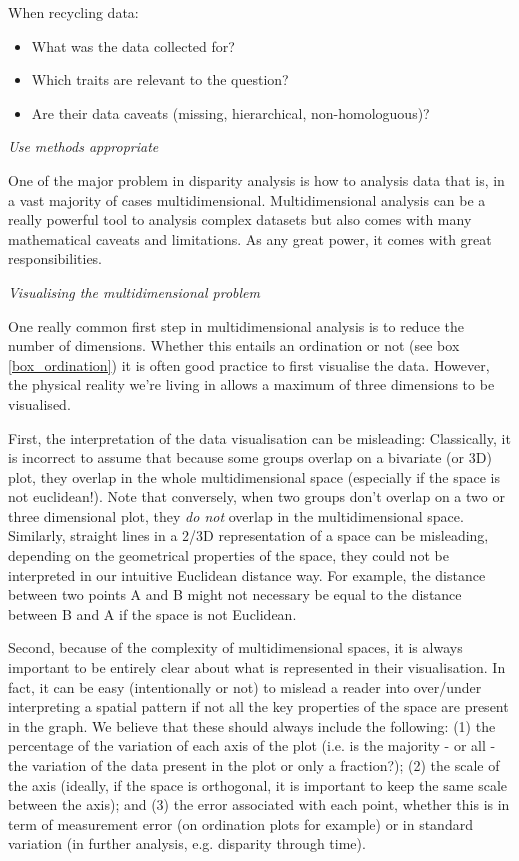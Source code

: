 \documentclass[12pt,letterpaper]{article}
\renewcommand{\subsection}[1]{%
\bigskip
\begin{center}
\begin{large}
\normalfont\itshape #1
\end{large}
\end{center}}
\begin{document}
When recycling data:
\begin{itemize}
    \item What was the data collected for?
    \item Which traits are relevant to the question?
    \item Are their data caveats (missing, hierarchical, non-homologuous)?
\end{itemize}


\subsection{Use methods appropriate} 
One of the major problem in disparity analysis is how to analysis data that is, in a vast majority of cases multidimensional.
Multidimensional analysis can be a really powerful tool to analysis complex datasets but also comes with many mathematical caveats and limitations.
As any great power, it comes with great responsibilities.


\subsection{Visualising the multidimensional problem}
\label{visualisation}
One really common first step in multidimensional analysis is to reduce the number of dimensions.
Whether this entails an ordination or not (see box \ref{box_ordination}) it is often good practice to first visualise the data.
However, the physical reality we're living in allows a maximum of three dimensions to be visualised.

First, the interpretation of the data visualisation can be misleading:
Classically, it is incorrect to assume that because some groups overlap on a bivariate (or 3D) plot, they overlap in the whole multidimensional space (especially if the space is not euclidean!).
Note that conversely, when two groups don't overlap on a two or three dimensional plot, they \textit{do not} overlap in the multidimensional space.
Similarly, straight lines in a 2/3D representation of a space can be misleading, depending on the geometrical properties of the space, they could not be interpreted in our intuitive Euclidean distance way.
For example, the distance between two points A and B might not necessary be equal to the distance between B and A if the space is not Euclidean.

Second, because of the complexity of multidimensional spaces, it is always important to be entirely clear about what is represented in their visualisation.
In fact, it can be easy (intentionally or not) to mislead a reader into over/under interpreting a spatial pattern if not all the key properties of the space are present in the graph.
We believe that these should always include the following:
(1) the percentage of the variation of each axis of the plot (i.e. is the majority - or all - the variation of the data present in the plot or only a fraction?);
(2) the scale of the axis (ideally, if the space is orthogonal, it is important to keep the same scale between the axis);
and (3) the error associated with each point, whether this is in term of measurement error (on ordination plots for example) or in standard variation (in further analysis, e.g. disparity through time).
\end{document}
